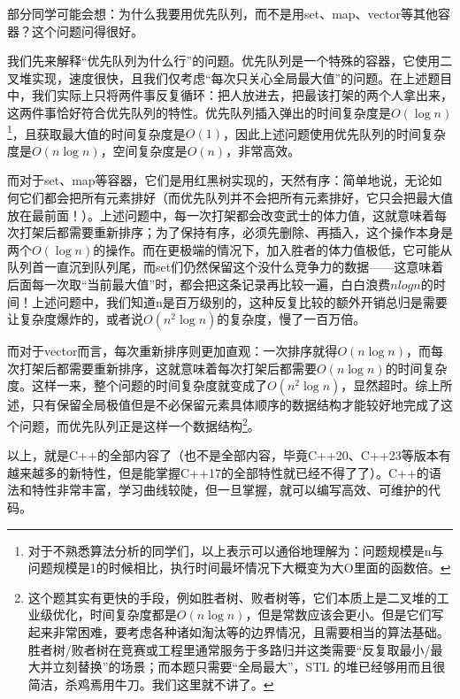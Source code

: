 \begin{note}
  部分同学可能会想：为什么我要用优先队列，而不是用set、map、vector等其他容器？这个问题问得很好。

  我们先来解释“优先队列为什么行”的问题。优先队列是一个特殊的容器，它使用二叉堆实现，速度很快，且我们仅考虑“每次只关心全局最大值”的问题。在上述题目中，我们实际上只将两件事反复循环：把人放进去，把最该打架的两个人拿出来，这两件事恰好符合优先队列的特性。优先队列插入弹出的时间复杂度是$O(\log n)$\footnote{对于不熟悉算法分析的同学们，以上表示可以通俗地理解为：问题规模是n与问题规模是1的时候相比，执行时间最坏情况下大概变为大O里面的函数倍。}，且获取最大值的时间复杂度是$O(1)$，因此上述问题使用优先队列的时间复杂度是$O(n \log n)$，空间复杂度是$O(n)$，非常高效。

  而对于set、map等容器，它们是用红黑树实现的，天然有序：简单地说，无论如何它们都会把所有元素排好（而优先队列并不会把所有元素排好，它只会把最大值放在最前面！）。上述问题中，每一次打架都会改变武士的体力值，这就意味着每次打架后都需要重新排序；为了保持有序，必须先删除、再插入，这个操作本身是两个$O(\log n)$的操作。而在更极端的情况下，加入胜者的体力值极低，它可能从队列首一直沉到队列尾，而set们仍然保留这个没什么竞争力的数据——这意味着后面每一次取“当前最大值”时，都会把这条记录再比较一遍，白白浪费$n log n $的时间！上述问题中，我们知道n是百万级别的，这种反复比较的额外开销总归是需要让复杂度爆炸的，或者说$O(n^2 \log n)$的复杂度，慢了一百万倍。

  而对于vector而言，每次重新排序则更加直观：一次排序就得$O(n \log n)$，而每次打架后都需要重新排序，这就意味着每次打架后都需要$O(n \log n)$的时间复杂度。这样一来，整个问题的时间复杂度就变成了$O(n^2 \log n)$，显然超时。综上所述，只有保留全局极值但是不必保留元素具体顺序的数据结构才能较好地完成了这个问题，而优先队列正是这样一个数据结构\footnote{这个题其实有更快的手段，例如胜者树、败者树等，它们本质上是二叉堆的工业级优化，时间复杂度都是$O(n \log n)$，但是常数应该会更小。但是它们写起来非常困难，要考虑各种诸如淘汰等的边界情况，且需要相当的算法基础。胜者树/败者树在竞赛或工程里通常服务于多路归并这类需要“反复取最小/最大并立刻替换”的场景；而本题只需要“全局最大”，STL 的堆已经够用而且很简洁，杀鸡焉用牛刀。我们这里就不讲了。}。
\end{note}

以上，就是C++的全部内容了（也不是全部内容，毕竟C++20、C++23等版本有越来越多的新特性，但是能掌握C++17的全部特性就已经不得了了）。C++的语法和特性非常丰富，学习曲线较陡，但一旦掌握，就可以编写高效、可维护的代码。


